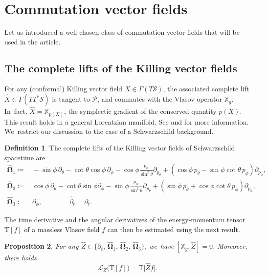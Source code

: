 \documentclass[JEP,XML,SOM,Unicode,published]{cedram}
\theoremstyle{plain}
\newtheorem{proposition}{Proposition}[section]
\theoremstyle{definition}
\newtheorem{definition}[proposition]{Definition}
\newcommand\T{{\mathbb{X}}}
\begin{document}
\section{Commutation vector fields}\label{Sec5}

Let us introduced a well-chosen class of commutation vector fields that will be used in the article.

\subsection{The complete lifts of the Killing vector fields}\label{Subseclift}

For any (conformal) Killing vector field $X\in \Gamma(T\mathcal{S})$, the associated complete lift $\widehat{X}\in \Gamma(TT^*\mathcal{S})$ is tangent to $\mathcal{P}$, and commutes with the Vlasov operator $\T_g$. In~fact, $\widehat{X} =\T_{p(X)}$, the symplectic gradient of the conserved quantity $p(X)$. This result holds in a general Lorentzian manifold. See \cite[App.\,F]{AGS} and \cite[App.\,C]{FJS17} for more information. We~restrict our discussion to the case of a Schwarzschild background.

\begin{definition}
The complete lifts of the Killing vector fields of Schwarzschild spacetime are
\begin{align*}
\widehat{\mathbf{\Omega}}_1 \coloneqq &\,-\sin \phi \,\partial_{\theta}-\cot \theta\cos \phi \,\partial_{\phi}-\cos\phi\frac{p_{\phi}}{\sin^2\theta}\partial_{p_{\theta}}+(\cos \phi \,p_{\theta}-\sin\phi \cot \theta \,p_{\phi})\partial_{p_{\phi}},\\
\widehat{\mathbf{\Omega}}_2 \coloneqq &\,\cos\phi \,\partial_{\theta}-\cot \theta\sin\phi\partial_{\phi}-\sin\phi \frac{p_{\phi}}{\sin^2\theta}\partial_{p_{\theta}}+(\sin\phi \,p_{\theta}+\cos\phi \cot \theta \,p_{\phi})\partial_{p_{\phi}},\\
\widehat{\mathbf{\Omega}}_3 \coloneqq &\,\partial_{\phi},\qquad\qquad \widehat{\partial}_t=\partial_t.
\end{align*}
\end{definition}

The time derivative and the angular derivatives of the energy-momentum tensor $\mathrm{T}[f]$ of a massless Vlasov field $f$ can then be estimated using the next result.

\begin{proposition}\label{ProKilling}
For any $\widehat{Z} \in \bigl\{ \partial_t,\, \widehat{\mathbf{\Omega}}_1,\, \widehat{\mathbf{\Omega}}_2,\, \widehat{\mathbf{\Omega}}_3 \bigr\}$, we~have $[\T_g,\widehat{Z} ]=0$. Moreover, there holds
\[
\mathcal{L}_Z \bigl(\mathrm{T}[f] \bigr) = \mathrm{T} \bigl[ \widehat{Z}f \bigr].
\]
\end{proposition}
\end{document}
